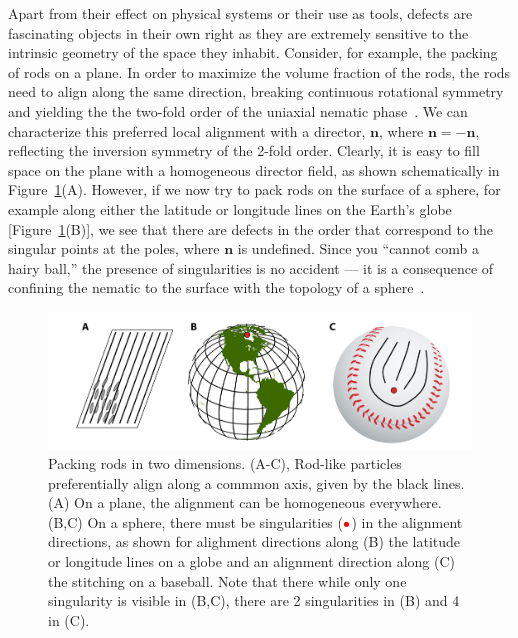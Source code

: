 Apart from their effect on physical systems or their use as tools, defects are fascinating objects in their own right as they are extremely sensitive to the intrinsic geometry of the space they inhabit.
Consider, for example, the packing of rods on a plane.
In order to maximize the volume fraction of the rods, the rods need to align along the same direction, breaking continuous rotational symmetry and yielding the the two-fold order of the uniaxial nematic phase~\cite{RN204}.
We can characterize this preferred local alignment with a director, $\mathbf{n}$, where $\mathbf{n} = \mathbf{-n}$, reflecting the inversion symmetry of the 2-fold order.
Clearly, it is easy to fill space on the plane with a homogeneous director field, as shown schematically in Figure~\ref{f:1-RodsPlane}(A).
However, if we now try to pack rods on the surface of a sphere, for example along either the latitude or longitude lines on the Earth's globe [Figure~\ref{f:1-RodsPlane}(B)], we see that there are defects in the order that correspond to the singular points at the poles, where $\mathbf{n}$ is undefined.
Since you ``cannot comb a hairy ball,'' the presence of singularities is no accident --- it is a consequence of confining the nematic to the surface with the topology of a sphere~\cite{RN209,RN169}.
\begin{figure}
  \centering
  \includegraphics{figures/C1/Ch1-Figs_RodsPlane.png}
  \caption{Packing rods in two dimensions.
  (A-C), Rod-like particles preferentially align along a commmon axis, given by the black lines.
  (A) On a plane, the alignment can be homogeneous everywhere.
  (B,C) On a sphere, there must be singularities (${\color{red} \bullet}$) in the alignment directions, as shown for alighment directions along (B) the latitude or longitude lines on a globe and an alignment direction along (C) the stitching on a baseball.
  Note that there while only one singularity is visible in (B,C), there are 2 singularities in (B) and 4 in (C).}\label{f:1-RodsPlane}
\end{figure}

